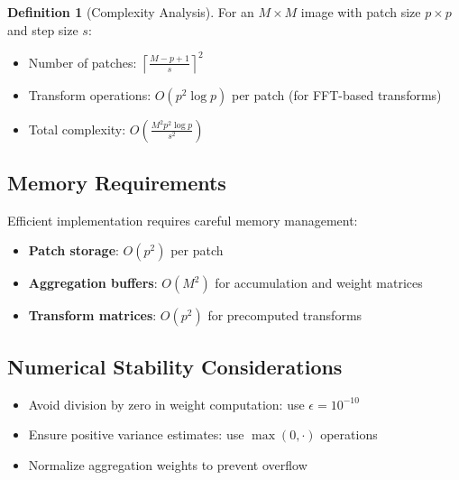 \documentclass[12pt]{article}
\theoremstyle{definition}
\newtheorem{definition}[theorem]{Definition}
\begin{document}
\begin{definition}[Complexity Analysis]
    \label{def:complexity}
    For an $M \times M$ image with patch size $p \times p$ and step size $s$:
    \begin{itemize}[leftmargin=*]
        \item Number of patches: $\left\lceil\frac{M-p+1}{s}\right\rceil^2$
        \item Transform operations: $O(p^2 \log p)$ per patch (for FFT-based transforms)
        \item Total complexity: $O\left(\frac{M^2 p^2 \log p}{s^2}\right)$
    \end{itemize}
\end{definition}

\subsection{Memory Requirements}
\label{subsec:memory_requirements}

Efficient implementation requires careful memory management:

\begin{itemize}[leftmargin=*]
    \item \textbf{Patch storage}: $O(p^2)$ per patch
    \item \textbf{Aggregation buffers}: $O(M^2)$ for accumulation and weight matrices
    \item \textbf{Transform matrices}: $O(p^2)$ for precomputed transforms
\end{itemize}

\subsection{Numerical Stability Considerations}
\label{subsec:numerical_stability}

\begin{itemize}[leftmargin=*]
    \item Avoid division by zero in weight computation: use $\epsilon = 10^{-10}$
    \item Ensure positive variance estimates: use $\max(0, \cdot)$ operations
    \item Normalize aggregation weights to prevent overflow
\end{itemize}

\newpage


\appendix
\end{document}
